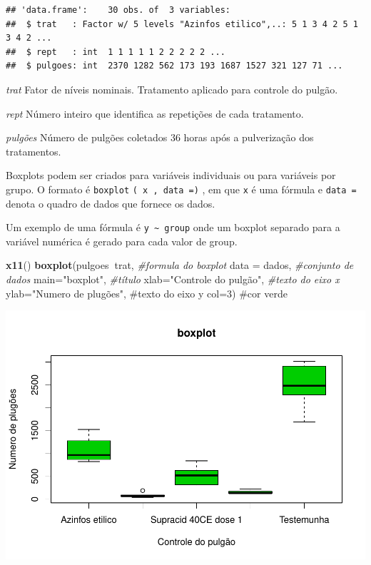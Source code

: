 \documentclass[]{book}
\newenvironment{Shaded}{\begin{snugshade}}{\end{snugshade}}
\newcommand{\CommentTok}[1]{\textcolor[rgb]{0.56,0.35,0.01}{\textit{#1}}}
\newcommand{\DataTypeTok}[1]{\textcolor[rgb]{0.13,0.29,0.53}{#1}}
\newcommand{\KeywordTok}[1]{\textcolor[rgb]{0.13,0.29,0.53}{\textbf{#1}}}
\newcommand{\NormalTok}[1]{#1}
\newcommand{\OperatorTok}[1]{\textcolor[rgb]{0.81,0.36,0.00}{\textbf{#1}}}
\newcommand{\StringTok}[1]{\textcolor[rgb]{0.31,0.60,0.02}{#1}}
\begin{document}
\begin{verbatim}
## 'data.frame':    30 obs. of  3 variables:
##  $ trat   : Factor w/ 5 levels "Azinfos etilico",..: 5 1 3 4 2 5 1 3 4 2 ...
##  $ rept   : int  1 1 1 1 1 2 2 2 2 2 ...
##  $ pulgoes: int  2370 1282 562 173 193 1687 1527 321 127 71 ...
\end{verbatim}

\emph{trat}
Fator de níveis nominais. Tratamento aplicado para controle do pulgão.

\emph{rept}
Número inteiro que identifica as repetições de cada tratamento.

\emph{pulgões}
Número de pulgões coletados 36 horas após a pulverização dos tratamentos.

Boxplots podem ser criados para variáveis individuais ou para variáveis por grupo. O formato é \texttt{boxplot} \texttt{(\ x\ ,\ data\ =)} , em que \texttt{x} é uma fórmula e \texttt{data\ =} denota o quadro de dados que fornece os dados.

Um exemplo de uma fórmula é \texttt{y\ \textasciitilde{}\ group} onde um boxplot separado para a variável numérica é gerado para cada valor de group.

\begin{Shaded}
\begin{Highlighting}[]
\KeywordTok{x11}\NormalTok{()}
\KeywordTok{boxplot}\NormalTok{(pulgoes}\OperatorTok{~}\NormalTok{trat,              }\CommentTok{#formula do boxplot}
        \DataTypeTok{data =}\NormalTok{ dados,              }\CommentTok{#conjunto de dados}
        \DataTypeTok{main=}\StringTok{"boxplot"}\NormalTok{,            }\CommentTok{#título}
        \DataTypeTok{xlab=}\StringTok{"Controle do pulgão"}\NormalTok{, }\CommentTok{#texto do eixo x }
        \DataTypeTok{ylab=}\StringTok{"Numero de plugões",  #texto do eixo y}
\StringTok{        col=3)                     #cor verde  }
\end{Highlighting}
\end{Shaded}

\includegraphics{TudodoR_files/figure-latex/unnamed-chunk-171-1.pdf}
\end{document}
